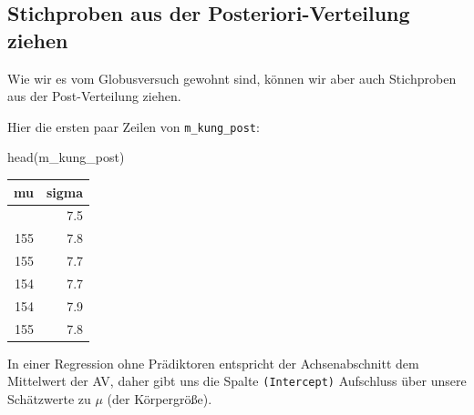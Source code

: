 \documentclass[
  ngerman,
  letterpaper,
  twoside,
  open=any]{scrbook}
\newenvironment{Shaded}{\begin{snugshade}}{\end{snugshade}}
\newcommand{\FunctionTok}[1]{\textcolor[rgb]{0.28,0.35,0.67}{#1}}
\newcommand{\NormalTok}[1]{\textcolor[rgb]{0.00,0.23,0.31}{#1}}
\newcounter{none} %
\theoremstyle{definition}
\theoremstyle{plain}
\theoremstyle{definition}
\theoremstyle{definition}
\theoremstyle{definition}
\theoremstyle{definition}
\theoremstyle{remark}
\begin{document}
\subsection{Stichproben aus der Posteriori-Verteilung
ziehen}\label{stichproben-aus-der-posteriori-verteilung-ziehen}

Wie wir es vom Globusversuch gewohnt sind, können wir aber auch
Stichproben aus der Post-Verteilung ziehen.

Hier die ersten paar Zeilen von \texttt{m\_kung\_post}:

\begin{Shaded}
\begin{Highlighting}[]
\FunctionTok{head}\NormalTok{(m\_kung\_post)}
\end{Highlighting}
\end{Shaded}

{\def\LTcaptype{none} %
\begin{longtable}[]{@{}rr@{}}
\toprule\noalign{}
mu & sigma \\
\midrule\noalign{}
\endhead
\bottomrule\noalign{}
\endlastfoot
154 & 7.5 \\
155 & 7.8 \\
155 & 7.7 \\
154 & 7.7 \\
154 & 7.9 \\
155 & 7.8 \\
\end{longtable}
}

In einer Regression ohne Prädiktoren entspricht der Achsenabschnitt dem
Mittelwert der AV, daher gibt uns die Spalte \texttt{(Intercept)}
Aufschluss über unsere Schätzwerte zu \(\mu\) (der Körpergröße).
\end{document}
